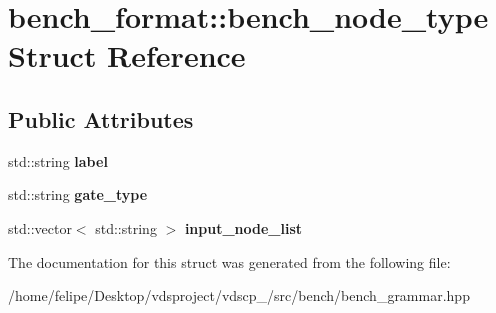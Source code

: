 \section{bench\+\_\+format\+:\+:bench\+\_\+node\+\_\+type Struct Reference}
\label{structbench__format_1_1bench__node__type}
\subsection*{Public Attributes}
\begin{DoxyCompactItemize}
\item 
std\+::string {\bfseries label}\label{structbench__format_1_1bench__node__type_ad84a489da088407c9eef963e35632b32}

\item 
std\+::string {\bfseries gate\+\_\+type}\label{structbench__format_1_1bench__node__type_aa6ff9b16997a95578623b93302abad12}

\item 
std\+::vector$<$ std\+::string $>$ {\bfseries input\+\_\+node\+\_\+list}\label{structbench__format_1_1bench__node__type_a006ef045067295870a13b146ebc10e52}

\end{DoxyCompactItemize}


The documentation for this struct was generated from the following file\+:\begin{DoxyCompactItemize}
\item 
/home/felipe/\+Desktop/vdsproject/vdscp\+\_/src/bench/bench\+\_\+grammar.\+hpp\end{DoxyCompactItemize}
